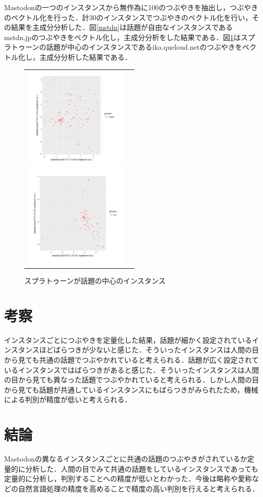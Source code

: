 \documentclass[uplatex,twocolumn,dvipdfmx]{jsarticle}
\begin{document}
Mastodonの一つのインスタンスから無作為に100のつぶやきを抽出し，つぶやきのベクトル化を行った．計30のインスタンスでつぶやきのベクトル化を行い，その結果を主成分分析した．図\ref{mstdn}は話題が自由なインスタンスであるmstdn.jpのつぶやきをベクトル化し，主成分分析をした結果である．図\ref{ika}はスプラトゥーンの話題が中心のインスタンスであるika.queloud.netのつぶやきをベクトル化し，主成分分析した結果である．
\begin{figure}[h]
\begin{tabular}{cc}
\begin{minipage}{0.5\hsize}
\begin{center}
\includegraphics[width=50mm,clip]{mstdn.pdf}
\caption{話題が自由なインスタンス}
\label{mstdn}
\end{center}
\end{minipage}
\begin{minipage}{0.5\hsize}
\begin{center}
\includegraphics[width=50mm,clip]{ika.pdf}
\caption{スプラトゥーンが話題の中心のインスタンス}
\label{ika}
\end{center} 
\end{minipage}
\end{tabular}
\end{figure}
\section{考察}

インスタンスごとにつぶやきを定量化した結果，話題が細かく設定されているインスタンスほどばらつきが少ないと感じた．そういったインスタンスは人間の目から見ても共通の話題でつぶやかれていると考えられる．話題が広く設定されているインスタンスではばらつきがあると感じた．そういったインスタンスは人間の目から見ても異なった話題でつぶやかれていると考えられる．しかし人間の目から見ても話題が共通しているインスタンスにもばらつきがみられたため，機械による判別が精度が低いと考えられる．

\section{結論}

Mastodonの異なるインスタンスごとに共通の話題のつぶやきがされているか定量的に分析した．人間の目でみて共通の話題をしているインスタンスであっても定量的に分析し，判別することへの精度が低いとわかった．今後は略称や愛称などの自然言語処理の精度を高めることで精度の高い判別を行えると考えられる．


\end{document}
